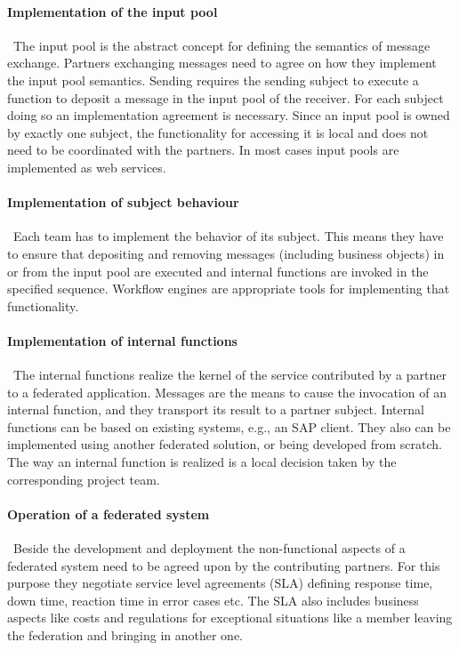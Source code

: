 \paragraph{Implementation of the input pool}\
The input pool is the abstract concept for defining the semantics of message exchange. Partners exchanging messages need to agree on how they implement the input pool semantics. Sending requires the sending subject to execute a function to deposit a message in the input pool of the receiver. For each subject doing so an implementation agreement is necessary. Since an input pool is owned by exactly one subject, the functionality for accessing it is local and does not need to be coordinated with the partners. In most cases input pools are implemented as web services.

\paragraph{Implementation of subject behaviour}\
Each team has to implement the behavior of its subject. This means they have to ensure that depositing and removing messages (including business objects) in or from the input pool are executed and internal functions are invoked in the specified sequence. Workflow engines are appropriate tools for implementing that functionality.\

\paragraph{Implementation of internal functions}\
The internal functions realize the kernel of the service contributed by a partner to a federated application. Messages are the means to cause the invocation of an internal function, and they transport its result to a partner subject. Internal functions can be based on existing systems, e.g., an SAP client.  They also can be implemented using another federated solution, or being developed from scratch. The way an internal function is realized is a local decision taken by the corresponding project team.

\paragraph{Operation of a federated system}\
Beside the development and deployment the non-functional aspects of a federated system need to be agreed upon by the contributing partners. For this purpose they negotiate service level agreements (SLA) defining response time, down time, reaction time in error cases etc. The SLA also includes business aspects like costs and regulations for exceptional situations like a member leaving the federation and bringing in another one.

